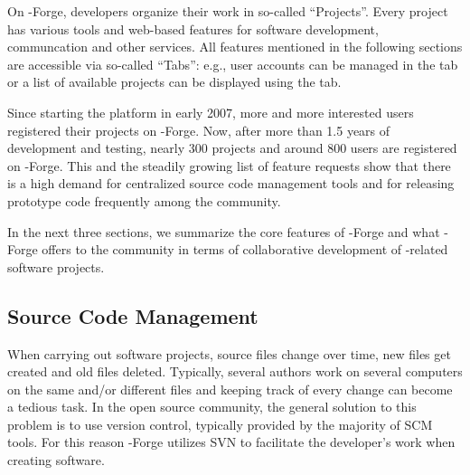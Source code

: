 




On \R{}-Forge, developers organize their work
in so-called ``Projects''. Every project has various tools and
web-based features for software development, communcation and other
services. All features mentioned in the 
following sections are accessible via so-called 
``Tabs'': e.g., user accounts can be managed in the  tab or
a list of available projects can be displayed using the
 tab.

Since starting the platform in early 2007, more
and more interested users registered their projects on
\R{}-Forge. Now, after more than 1.5 years of development and testing, nearly
300 projects and around 800 
users are registered on \R{}-Forge. This and the steadily growing list of
feature requests show that there is a high demand for centralized source code
management tools and for releasing prototype code frequently among the
\R{} community.

In the next three sections, we summarize the core features of
\R{}-Forge and what \R{}-Forge offers to the \R{} community in terms
of  collaborative development of \R{}-related software projects.

\subsection{Source Code Management}

When carrying out software projects, source files change over time,
new files get created and old files deleted. Typically, several authors
work on several computers on the same and/or different files and keeping
track of every change can become a tedious task. In the open source
community, the general solution to this problem is to use version
control, typically 
provided by the majority of SCM tools. For this reason \R{}-Forge
utilizes SVN to facilitate the developer's work when creating
software.

